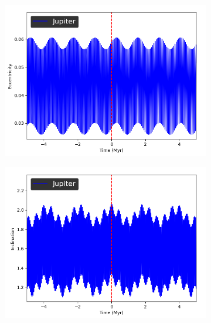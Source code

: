 \documentclass[11pt, oneside]{article}   	%
\begin{document}
\begin{figure}[!h]
	\ContinuedFloat
    \centering
    \begin{subfigure}[t]{0.49\textwidth}
    \captionsetup{width=0.9\textwidth}
	\centering
       	 \includegraphics[width=\textwidth]{Eccentricity_Jupiter}
    \end{subfigure}
    \begin{subfigure}[t]{0.49\textwidth}
    \captionsetup{width=0.9\textwidth}
        	\centering
	\includegraphics[width=\textwidth]{Inclination_Jupiter}
    \end{subfigure}
\end{figure}
\end{document}
